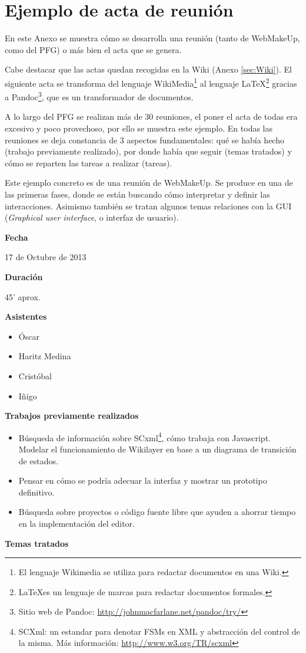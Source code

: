 \chapter{Ejemplo de acta de reunión}
\label{sec:ActasDeReunion}

En este Anexo se muestra cómo se desarrolla una reunión (tanto de WebMakeUp, como del PFG) o más bien el acta que se genera.

Cabe destacar que las actas quedan recogidas en la Wiki (Anexo \ref{sec:Wiki}). El siguiente acta se transforma del lenguaje WikiMedia\footnote{El lenguaje Wikimedia se utiliza para redactar documentos en una Wiki.} al lenguaje \LaTeX\footnote{\LaTeX es un lenguaje de marcas para redactar documentos formales.} gracias a Pandoc\footnote{Sitio web de Pandoc: \url{http://johnmacfarlane.net/pandoc/try/}}, que es un transformador de documentos.

A lo largo del PFG se realizan más de 30 reuniones, el poner el acta de todas era excesivo y poco provechoso, por ello se muestra este ejemplo. En todas las reuniones se deja constancia de 3 aspectos fundamentales: qué se había hecho (trabajo previamente realizado), por donde había que seguir (temas tratados) y cómo se reparten las tareas a realizar (tareas).

Este ejemplo concreto es de una reunión de WebMakeUp. Se produce en una de las primeras fases, donde se están buscando cómo interpretar y definir las interacciones. Asimismo también se tratan algunos temas relaciones con la GUI (\emph{Graphical user interface}, o interfaz de usuario).

\textbf{Fecha}

17 de Octubre de 2013

\textbf{Duración}

45' aprox.

\textbf{Asistentes}

\begin{itemize}
\itemsep1pt\parskip0pt
\item
  Óscar
\item
  Haritz Medina
\item
  Cristóbal
\item
  Iñigo
\end{itemize}

\textbf{Trabajos previamente realizados}

\begin{itemize}
\item Búsqueda de información sobre SCxml\footnote{SCXml: un estandar para denotar FSMs en XML y abstracción del control de la misma. Más información: \url{http://www.w3.org/TR/scxml}}, cómo trabaja con Javascript. Modelar el funcionamiento de Wikilayer en base a un diagrama de transición de estados.
\item Pensar en cómo se podría adecuar la interfaz y mostrar un prototipo definitivo.
\item Búsqueda sobre proyectos o código fuente libre que ayuden a ahorrar tiempo en la implementación del editor.
\end{itemize}
\textbf{Temas tratados}


